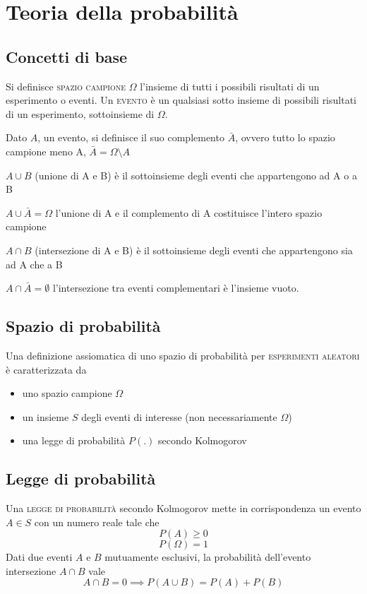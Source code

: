 \chapter{Teoria della probabilità}
\label{ch:teoriasegnali-capitolo4}
\section{Concetti di base}
Si definisce \textsc{spazio campione} $\Omega$ l'insieme di tutti i possibili risultati di un esperimento o eventi. Un \textsc{evento} è un qualsiasi sotto insieme di possibili risultati di un esperimento, sottoinsieme di $\Omega$.

Dato $A$, un evento, si definisce il suo complemento $\bar{A}$, ovvero tutto lo spazio campione meno A, $\bar{A}=\Omega\setminus A$

$A\cup B$ (unione di A e B) è il sottoinsieme degli eventi che appartengono ad A o a B

$A\cup\bar{A}=\Omega$ l'unione di A e il complemento di A costituisce l'intero spazio campione

$A\cap B$ (intersezione di A e B) è il sottoinsieme degli eventi che appartengono sia ad A che a B

$A\cap\bar{A}=\emptyset$ l'intersezione tra eventi complementari è l'insieme vuoto.

\section{Spazio di probabilità}
Una definizione assiomatica di uno spazio di probabilità per \textsc{esperimenti aleatori} è caratterizzata da
\begin{itemize}
	\item uno spazio campione $\Omega$
	\item un insieme $S$ degli eventi di interesse (non necessariamente $\Omega$)
	\item una legge di probabilità $P(.)$ secondo Kolmogorov
\end{itemize}

\section{Legge di probabilità}
Una \textsc{legge di probabilità} secondo Kolmogorov mette in corrispondenza un evento $A\in S$ con un numero reale tale che
\begin{equation}
	P(A)\geq 0
\end{equation}
\begin{equation}
	P(\Omega)=1
\end{equation}
Dati due eventi $A$ e $B$ mutuamente esclusivi, la probabilità dell'evento intersezione $A\cap B$ vale
\begin{equation}
	A\cap B=0\implies P(A\cup B)=P(A)+P(B)
\end{equation}

